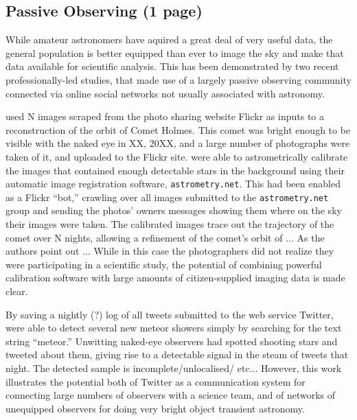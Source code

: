 \documentclass{ar2e}
\begin{document}
\subsection{Passive Observing (1 page)}
\label{sec:obs:passive}

While amateur astronomers have aquired a great deal of very useful data, the
general population is better equipped than ever to image the sky and make that
data available for scientific analysis. This has been demonstrated by two
recent professionally-led studies, that made use of a largely passive
observing community connected via online social networks not usually
associated with astronomy. 

\citet{Lang++2011} used N images scraped from the photo sharing website Flickr
as inputs to a reconstruction of the orbit of Comet Holmes. This comet was
bright enough to be visible with the naked eye in XX, 20XX, and a large number
of photographs were taken of it, and uploaded to the Flickr site.
\citeauthor{Lang++2011} were able to astrometrically calibrate the images that
contained enough detectable stars in the background using their automatic
image registration software, \texttt{astrometry.net}. This had been enabled as
a Flickr ``bot,'' crawling over all images submitted to the
\texttt{astrometry.net} group and sending the photos' owners messages showing
them where on the sky their images were taken. The calibrated images trace out
the trajectory of the comet over N nights, allowing a refinement of the
comet's orbit of ... As the authors point out ...  While in this case the
photographers did not realize they were participating in a scientific study,
the potential of combining powerful calibration software with large amounts of
citizen-supplied imaging data is made clear. 


By saving a nightly (?) log of all tweets submitted to the web service
Twitter, \citet{Barentsen++2010} were able to 
detect several new meteor showers simply by searching for the text string
``meteor.'' Unwitting naked-eye observers had spotted shooting stars and
tweeted about them, giving rise to a detectable signal in the steam of tweets
that night. The detected sample is incomplete/unlocalised/ etc... However,
this work illustrates the potential both of Twitter as a communication system
for connecting large numbers of observers with a science team, and of networks
of unequipped observers for doing very bright object transient astronomy.
\end{document}
